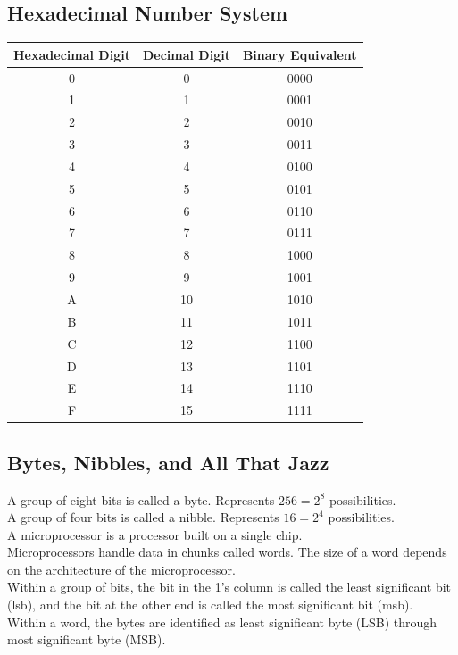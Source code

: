 \documentclass[12pt]{article}
\theoremstyle{definition}
\begin{document}
  \subsection{Hexadecimal Number System}
  \begin{tabular} {c | c | c}
  Hexadecimal Digit & Decimal Digit & Binary Equivalent \\ \hline
  0 & 0 & 0000 \\ \hline
  1 & 1 & 0001 \\ \hline
  2 & 2 & 0010 \\ \hline
  3 & 3 & 0011 \\ \hline
  4 & 4 & 0100 \\ \hline
  5 & 5 & 0101 \\ \hline
  6 & 6 & 0110 \\ \hline
  7 & 7 & 0111 \\ \hline
  8 & 8 & 1000 \\ \hline
  9 & 9 & 1001 \\ \hline
  A & 10 & 1010 \\ \hline
  B & 11 & 1011 \\ \hline
  C & 12 & 1100 \\ \hline
  D & 13 & 1101 \\ \hline
  E & 14 & 1110 \\ \hline
  F & 15 & 1111 \\
  \end{tabular}

  \subsection{Bytes, Nibbles, and All That Jazz}
  A group of eight bits is called a byte. Represents $256 = 2^{8}$ possibilities. \\
  A group of four bits is called a nibble. Represents $16 = 2^{4}$ possibilities. \\
  A microprocessor is a processor built on a single chip. \\
  Microprocessors handle data in chunks called words. The size of a word depends on the architecture of the microprocessor. \\
  Within a group of bits, the bit in the 1's column is called the least significant bit (lsb), and the bit at the other end is called the most significant bit (msb). \\
  Within a word, the bytes are identified as least significant byte (LSB) through most significant byte (MSB). \\
\end{document}
